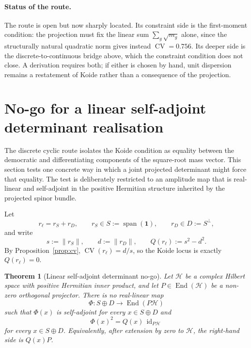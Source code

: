 \documentclass[11pt]{article}
\newtheorem{theorem}{Theorem}
\theoremstyle{definition}
\theoremstyle{remark}
\newcommand{\CV}{\operatorname{CV}}
\newcommand{\rl}{r_{\ell}}
\begin{document}
    \paragraph{Status of the route.}
    The route is open but now sharply located.
    Its constraint side is the first-moment condition: the projection must fix the linear sum $\sum_g \sqrt{m_g}$
    alone, since the structurally natural quadratic norm gives instead $\CV = 0.756$.
    Its deeper side is the discrete-to-continuous bridge above, which the constraint condition does not close.
    A derivation requires both; if either is chosen by hand, unit dispersion remains a restatement of Koide rather
    than a consequence of the projection.

  \section{No-go for a linear self-adjoint determinant realisation}
    \label{sec:determinant-nogo}

    The discrete cyclic route isolates the Koide condition as equality between the democratic and differentiating
    components of the square-root mass vector.
    This section tests one concrete way in which a joint projected determinant might force that equality.
    The test is deliberately restricted to an amplitude map that is real-linear and self-adjoint in the positive
    Hermitian structure inherited by the projected spinor bundle.

    Let
    \begin{equation}
      \label{eq:sd-decomposition}
      \rl = r_S + r_D,
      \qquad
      r_S \in S := \operatorname{span}(\mathbf 1),
      \qquad
      r_D \in D := S^\perp,
    \end{equation}
    and write
    \begin{equation}
      \label{eq:sd-quadratic-form}
      s := \lVert r_S\rVert,
      \qquad
      d := \lVert r_D\rVert,
      \qquad
      Q(\rl) := s^2-d^2.
    \end{equation}
    By Proposition~\ref{prop:cv}, $\CV(\rl)=d/s$, so the Koide locus is exactly $Q(\rl)=0$.

    \begin{theorem}[Linear self-adjoint determinant no-go]
      \label{thm:linear-determinant-nogo}
      Let $\mathcal H$ be a complex Hilbert space with positive Hermitian inner product, and let
      $P\in\operatorname{End}(\mathcal H)$ be a non-zero orthogonal projector.
      There is no real-linear map
      \[
        \Phi:S\oplus D\longrightarrow\operatorname{End}(P\mathcal H)
      \]
      such that $\Phi(x)$ is self-adjoint for every $x\in S\oplus D$ and
      \begin{equation}
        \label{eq:phi-square}
        \Phi(x)^2=Q(x)\,\operatorname{id}_{P\mathcal H}
      \end{equation}
      for every $x\in S\oplus D$.
      Equivalently, after extension by zero to $\mathcal H$, the right-hand side is $Q(x)P$.
    \end{theorem}
\end{document}
